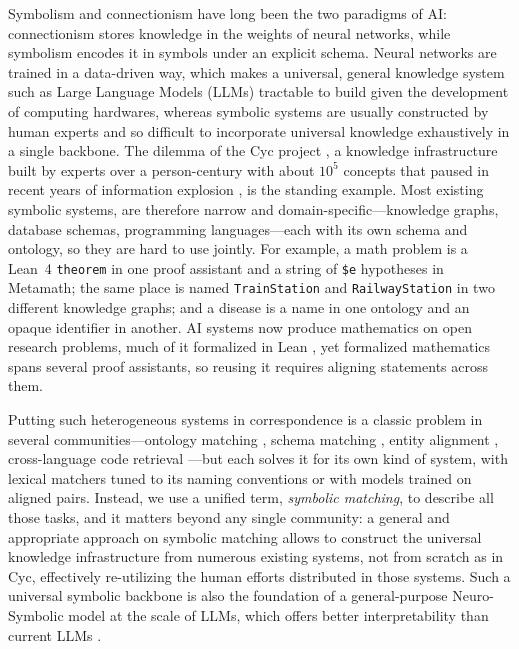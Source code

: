 \documentclass[11pt]{article}
\begin{document}
Symbolism and connectionism have long been the two paradigms of AI: connectionism stores knowledge in the weights of neural networks, while symbolism encodes it in symbols under an explicit schema.
Neural networks are trained in a data-driven way, which makes a universal, general knowledge system such as Large Language Models (LLMs) tractable to build given the development of computing hardwares,
whereas symbolic systems are usually constructed by human experts and so difficult to incorporate universal knowledge exhaustively in a single backbone. The dilemma of the Cyc project \citep{lenat1995cyc}, a knowledge infrastructure built by experts over a person-century with about $10^5$ concepts that paused in recent years of information explosion \citep{yang2026generative}, is the standing example.
Most existing symbolic systems, are therefore narrow and domain-specific---knowledge graphs, database schemas, programming languages---each with its own schema and ontology, so they are hard to use jointly. For example, a math problem is a Lean~4 \texttt{theorem} in one proof assistant and a string of \texttt{\$e} hypotheses in Metamath; the same place is named \texttt{TrainStation} and \texttt{RailwayStation} in two different knowledge graphs; and a disease is a name in one ontology and an opaque identifier in another. AI systems now produce mathematics on open research problems, much of it formalized in Lean \citep{openai2026math}, yet formalized mathematics spans several proof assistants, so reusing it requires aligning statements across them.


Putting such heterogeneous systems in correspondence is a classic problem in several communities---ontology matching \citep{euzenat2013ontology}, schema matching \citep{rahm2001survey}, entity alignment \citep{sun2020benchmarking}, cross-language code retrieval \citep{zhu2022xlcost}---but each solves it for its own kind of system, with lexical matchers tuned to its naming conventions or with models trained on aligned pairs. Instead, we use a unified term, \emph{symbolic matching}, to describe all those tasks, and it matters beyond any single community: a general and appropriate approach on symbolic matching allows to construct the universal knowledge infrastructure from numerous existing systems, not from scratch as in Cyc, effectively re-utilizing the human efforts distributed in those systems. Such a universal symbolic backbone is also the foundation of a general-purpose Neuro-Symbolic model at the scale of LLMs, which offers better interpretability than current LLMs \citep{yang2026generative}.
\end{document}
